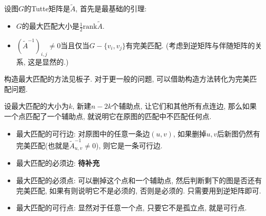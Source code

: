 设图$G$的Tutte矩阵是$\tilde A$, 首先是最基础的引理:

\begin{itemize}
	\item $G$的最大匹配大小是$\frac 1 2 \text{rank}{\tilde A}$.
	
	\item $({\tilde A} ^{-1}) _{i, j} \ne 0$当且仅当$G-\{v_i, v_j\}$有完美匹配.
		\subitem (考虑到逆矩阵与伴随矩阵的关系, 这是显然的.)
\end{itemize}

构造最大匹配的方法见板子. 对于更一般的问题, 可以借助构造方法转化为完美匹配问题.

设最大匹配的大小为$k$, 新建$n - 2 k$个辅助点, 让它们和其他所有点连边, 那么如果一个点匹配了一个辅助点, 就说明它在原图的匹配中不匹配任何点.

\begin{itemize}
	\item 最大匹配的可行边: 对原图中的任意一条边$(u, v)$, 如果删掉$u, v$后新图仍然有完美匹配(也就是${\tilde A} ^ {-1}_{u, v} \ne 0$), 则它是一条可行边.
	
	\item 最大匹配的必须边: \textbf{待补充}
	
	\item 最大匹配的必须点: 可以删掉这个点和一个辅助点, 然后判断剩下的图是否还有完美匹配, 如果有则说明它不是必须的, 否则是必须的. 只需要用到逆矩阵即可.
	
	\item 最大匹配的可行点: 显然对于任意一个点, 只要它不是孤立点, 就是可行点.
\end{itemize}